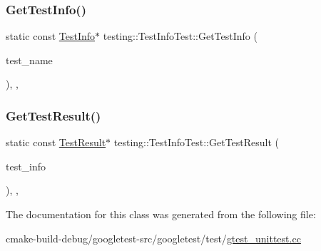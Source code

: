 \subsubsection{\texorpdfstring{GetTestInfo()}{GetTestInfo()}}
{\footnotesize\ttfamily static const \mbox{\hyperlink{classtesting_1_1TestInfo}{Test\+Info}}$\ast$ testing\+::\+Test\+Info\+Test\+::\+Get\+Test\+Info (\begin{DoxyParamCaption}\item[{const char $\ast$}]{test\+\_\+name }\end{DoxyParamCaption})\hspace{0.3cm}{\ttfamily [inline]}, {\ttfamily [static]}, {\ttfamily [protected]}}

\mbox{\label{classtesting_1_1TestInfoTest_a154b3679b1aa00ad037ce46eb60d18c3}} 
\subsubsection{\texorpdfstring{GetTestResult()}{GetTestResult()}}
{\footnotesize\ttfamily static const \mbox{\hyperlink{classtesting_1_1TestResult}{Test\+Result}}$\ast$ testing\+::\+Test\+Info\+Test\+::\+Get\+Test\+Result (\begin{DoxyParamCaption}\item[{const \mbox{\hyperlink{classtesting_1_1TestInfo}{Test\+Info}} $\ast$}]{test\+\_\+info }\end{DoxyParamCaption})\hspace{0.3cm}{\ttfamily [inline]}, {\ttfamily [static]}, {\ttfamily [protected]}}



The documentation for this class was generated from the following file\+:\begin{DoxyCompactItemize}
\item 
cmake-\/build-\/debug/googletest-\/src/googletest/test/\mbox{\hyperlink{gtest__unittest_8cc}{gtest\+\_\+unittest.\+cc}}\end{DoxyCompactItemize}
